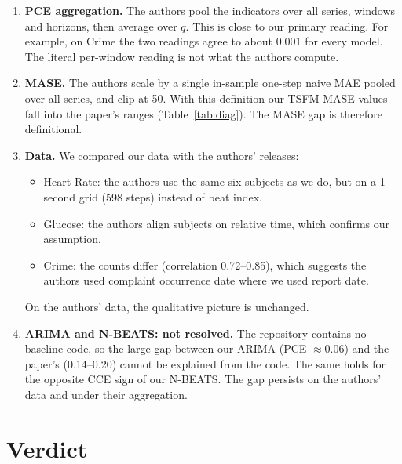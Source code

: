 \begin{enumerate}
\item \textbf{PCE aggregation.} The authors pool the indicators over all series, windows and horizons, then
average over $q$. This is close to our primary reading. For example, on Crime the two readings agree to about
0.001 for every model. The literal per-window reading is not what the authors compute.
\item \textbf{MASE.} The authors scale by a single in-sample one-step naive MAE pooled over all series, and clip
at 50. With this definition our TSFM MASE values fall into the paper's ranges (Table~\ref{tab:diag}). The MASE gap
is therefore definitional.
\item \textbf{Data.} We compared our data with the authors' releases:
\begin{itemize}
\item Heart-Rate: the authors use the same six subjects as we do, but on a 1-second grid (598 steps) instead of
beat index.
\item Glucose: the authors align subjects on relative time, which confirms our assumption.
\item Crime: the counts differ (correlation 0.72--0.85), which suggests the authors used complaint occurrence date
where we used report date.
\end{itemize}
On the authors' data, the qualitative picture is unchanged.
\item \textbf{ARIMA and N-BEATS: not resolved.} The repository contains no baseline code, so the large gap
between our ARIMA (PCE $\approx0.06$) and the paper's (0.14--0.20) cannot be explained from the code. The same
holds for the opposite CCE sign of our N-BEATS. The gap persists on the authors' data and under their aggregation.
\end{enumerate}

\section{Verdict}

\begin{table}[h!]\centering\scriptsize\setlength\tabcolsep{3pt}

\caption{Per-dataset checks of C1a and C1b (\texttt{results/verdict.csv}; N-BEATS rows are seed~1). ``Series-pair
wins'' counts the (TSFM, series) pairs in which the TSFM has lower per-series PCE than the baseline. ``Not
claimed'': the paper exempts Patents from C1b (\S4.1).}
\label{tab:verdict}
\end{table}


